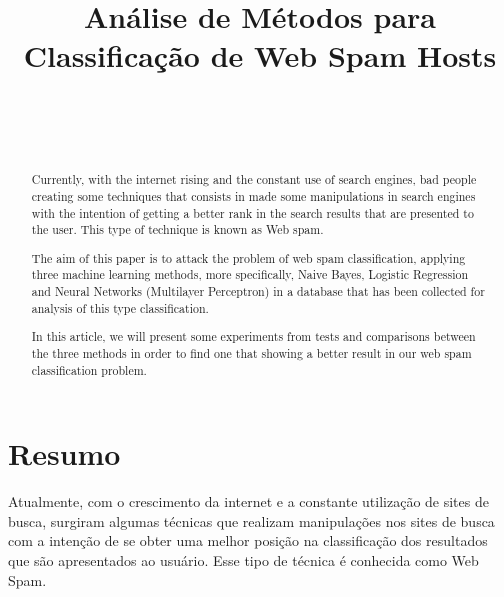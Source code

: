 \documentclass[10pt, conference, compsocconf]{IEEEtran}
\begin{document}
\title{Análise de Métodos para Classificação de Web Spam Hosts}

\author{
\\
\and
{}
\\
}
\maketitle 

\begin{abstract}
Currently, with the internet rising and the constant use of search engines, bad people creating some techniques that consists in made some manipulations in search engines with the intention of getting a better rank in the search results that are presented to the user. This type of technique is known as Web spam.

The aim of this paper is to attack the problem of web spam classification, applying three machine learning methods, more specifically, Naive Bayes, Logistic Regression and Neural Networks (Multilayer Perceptron) in a database that has been collected for analysis of this type classification.

In this article, we will present some experiments from tests and comparisons between the three methods in order to find one that showing a better result in our web spam classification problem.

\end{abstract}

\section{Resumo}
Atualmente, com o crescimento da internet e a constante utilização de sites de busca, surgiram algumas técnicas que realizam manipulações nos sites de busca com a intenção de se obter uma melhor posição na classificação dos resultados que são apresentados ao usuário. Esse tipo de técnica é conhecida como Web Spam.
\end{document}

